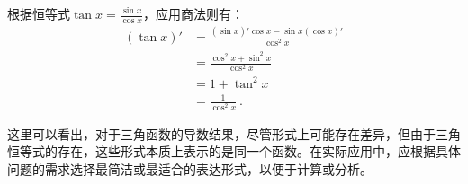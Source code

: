 根据恒等式$\tan x=\frac{\sin x}{\cos x}$，应用商法则有：
\begin{equation}
\begin{split}
(\tan x)'&=\frac{(\sin x)'\cos x-\sin x(\cos x)'}{\cos^2 x}\\
&=\frac{\cos^2 x+\sin^2 x}{\cos^2 x}\\
&=1+\tan^2 x\\
&=\frac{1}{\cos^2 x}~.
\end{split}
\end{equation}

这里可以看出，对于三角函数的导数结果，尽管形式上可能存在差异，但由于三角恒等式的存在，这些形式本质上表示的是同一个函数。在实际应用中，应根据具体问题的需求选择最简洁或最适合的表达形式，以便于计算或分析。